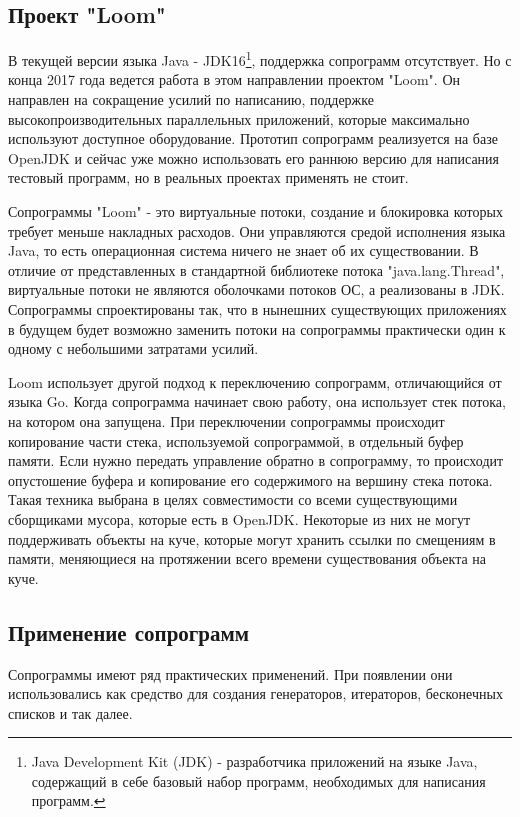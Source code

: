 	\subsection{Проект "Loom"}
	В текущей версии языка Java - JDK16\footnote{Java Development Kit (JDK) - разработчика приложений на языке Java,
	содержащий в себе базовый набор программ, необходимых для написания программ.}, поддержка 
	сопрограмм отсутствует. Но с конца 2017 года ведется 
	работа в этом направлении проектом "Loom". Он направлен на сокращение усилий по написанию, поддержке
	высокопроизводительных параллельных приложений, которые максимально используют доступное
	оборудование\cite{loom-main}. Прототип сопрограмм реализуется на базе OpenJDK и сейчас уже можно использовать
	его	раннюю версию для написания тестовый программ, но в реальных проектах применять не стоит.
	\par
	Сопрограммы "Loom" - это виртуальные потоки, создание и блокировка которых требует меньше накладных расходов\cite{loom-main}. Они управляются средой исполнения языка Java, то есть операционная
	система ничего не знает об их существовании. В отличие от представленных в стандартной библиотеке потока
	"java.lang.Thread", виртуальные потоки не являются оболочками потоков ОС, а реализованы в JDK.
	Сопрограммы спроектированы так, что в нынешних существующих приложениях в будущем будет
	возможно заменить потоки на сопрограммы практически один к одному с небольшими
	затратами усилий.
	
	\par
	Loom использует другой подход к переключению сопрограмм, отличающийся от языка Go. Когда сопрограмма начинает
	свою работу, она использует стек потока, на котором она запущена. При переключении сопрограммы происходит
	копирование части стека, используемой сопрограммой, в отдельный буфер памяти. Если нужно передать 
	управление обратно в сопрограмму, то происходит опустошение буфера и копирование его содержимого на 
	вершину стека потока\cite{loom-main}. Такая техника выбрана в целях совместимости со всеми существующими 
	сборщиками мусора, которые есть в OpenJDK. Некоторые из них не могут поддерживать объекты на куче, которые
	могут хранить ссылки по смещениям в памяти, меняющиеся на протяжении всего времени существования объекта на куче.
	\clearpage
	
	\subsection{Применение сопрограмм}
	Сопрограммы имеют ряд практических применений. При появлении они использовались как средство
	для создания генераторов, итераторов, бесконечных списков и так далее. 
	
